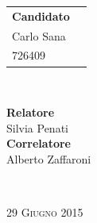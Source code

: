 \begin{titlepage}
 \vspace{8.7cm}

\begin{minipage}{0.4\textwidth}
\begin{flushleft} \large

\begin{tabular}{l r }
\textbf{Candidato} \\

\textsf{Carlo Sana}  &
\\
\textsf{726409} & 

\end{tabular}

\end{flushleft}

\vfill
\end{minipage}
~
\begin{minipage}{0.4\textwidth}
\begin{flushright} \large
\textbf{Relatore} \\
\textsf{Silvia Penati}
\\[0.5cm]
\textbf{Correlatore}\\
\textsf{Alberto Zaffaroni}
\end{flushright}
\end{minipage}\\

\vfill


{\large \textsc{29 Giugno 2015}}


 
%

\end{titlepage}